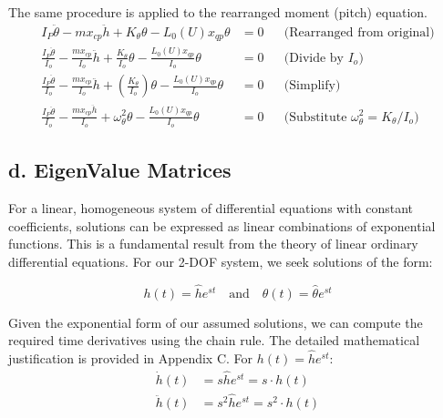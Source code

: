 \documentclass{article}
\begin{document}
\noindent The same procedure is applied to the rearranged moment (pitch) equation.
\begin{align}
    I_P \ddot{\theta} - m x_{cp} \ddot{h} + K_{\theta} \theta - L_0(U) x_{qp} \theta &= 0                      && \text{(Rearranged from original)} \label{eq:pitch_rearranged} \\
    \frac{I_P \ddot{\theta}}{I_o} - \frac{m x_{cp}}{I_o} \ddot{h} + \frac{K_{\theta}}{I_o} \theta - \frac{L_0(U) x_{qp}}{I_o} \theta &= 0 && \text{(Divide by } I_o\text{)} \label{eq:pitch_divided} \\
    \frac{I_P \ddot{\theta}}{I_o} - \frac{m x_{cp}}{I_o} \ddot{h} + \left(\frac{K_{\theta}}{I_o}\right) \theta - \frac{L_0(U) x_{qp}}{I_o} \theta &= 0 && \text{(Simplify)} \label{eq:pitch_simplified} \\
    \frac{I_P \ddot{\theta}}{I_o} - \frac{m x_{cp} \ddot{h}}{I_o}  + \omega_\theta^2 \theta - \frac{L_0(U) x_{qp}}{I_o} \theta &= 0         && \text{(Substitute } \omega_\theta^2 = K_\theta/I_o\text{)} \label{eq:pitch_frequency_form}%
\end{align}




\newpage
\newpage
\subsection{d. EigenValue Matrices}
For a linear, homogeneous system of differential equations with constant coefficients, solutions can be expressed as linear combinations of exponential functions. This is a fundamental result from the theory of linear ordinary differential equations. For our 2-DOF system, we seek solutions of the form:

\begin{equation}
h(t) = \hat{h} e^{st} \quad \text{and} \quad \theta(t) = \hat{\theta} e^{st}
\label{eq:exponential_solutions}
\end{equation}


Given the exponential form of our assumed solutions, we can compute the required time derivatives using the chain rule. The detailed mathematical justification is provided in Appendix C.
\newline\newline
For $h(t) = \hat{h} e^{st}$:
\begin{align}
\dot{h}(t) &= s \hat{h} e^{st} = s \cdot h(t) \\
\ddot{h}(t) &= s^2 \hat{h} e^{st} = s^2 \cdot h(t)
\end{align}
\end{document}
